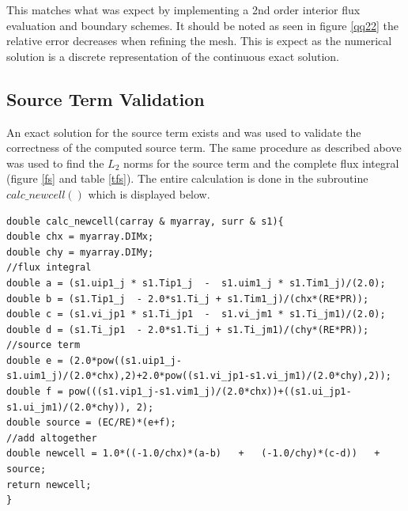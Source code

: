\documentclass[paper=a4, fontsize=11pt, abstract=on]{scrartcl}
\numberwithin{equation}{section}		%
\numberwithin{figure}{section}			%
\numberwithin{table}{section}				%
\begin{document}
This matches what was expect by implementing a 2nd order interior flux evaluation and boundary schemes. It should be noted as seen in figure \ref{qq22} the relative error decreases when refining the mesh. This is expect as the numerical solution is a discrete representation of the continuous exact solution. 

 




\subsection{Source Term Validation}
An exact solution for the source term exists and was used to validate the correctness of the computed source term. The same procedure as described above was used to find the $L_2$ norms for the source term and the complete flux integral (figure \ref{fs} and table \ref{tfs}). The entire calculation is done in the subroutine $calc\_ newcell()$ which is displayed below.
\begin{lstlisting}
double calc_newcell(carray & myarray, surr & s1){
double chx = myarray.DIMx;
double chy = myarray.DIMy;
//flux integral
double a = (s1.uip1_j * s1.Tip1_j  -  s1.uim1_j * s1.Tim1_j)/(2.0);
double b = (s1.Tip1_j  - 2.0*s1.Ti_j + s1.Tim1_j)/(chx*(RE*PR));
double c = (s1.vi_jp1 * s1.Ti_jp1  -  s1.vi_jm1 * s1.Ti_jm1)/(2.0);
double d = (s1.Ti_jp1  - 2.0*s1.Ti_j + s1.Ti_jm1)/(chy*(RE*PR));
//source term
double e = (2.0*pow((s1.uip1_j-s1.uim1_j)/(2.0*chx),2)+2.0*pow((s1.vi_jp1-s1.vi_jm1)/(2.0*chy),2));
double f = pow(((s1.vip1_j-s1.vim1_j)/(2.0*chx))+((s1.ui_jp1-s1.ui_jm1)/(2.0*chy)), 2);
double source = (EC/RE)*(e+f);
//add altogether
double newcell = 1.0*((-1.0/chx)*(a-b)   +   (-1.0/chy)*(c-d))   +   source;
return newcell;
}
\end{lstlisting}
\end{document}
